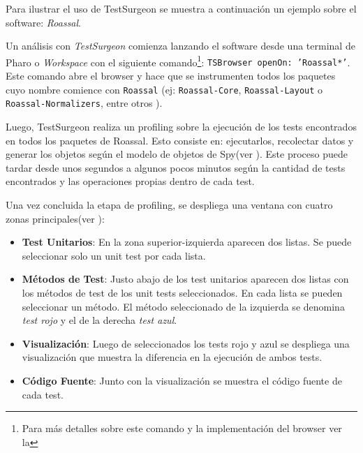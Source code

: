 \par Para ilustrar el uso de TestSurgeon se muestra a continuación un ejemplo sobre el software: \emph{Roassal}.

\par Un análisis con \emph{TestSurgeon} comienza lanzando el software desde una terminal de Pharo o \emph{Workspace} con el siguiente comando\footnote{Para más detalles sobre este comando y la implementación del browser ver la  }: {\tt TSBrowser openOn: 'Roassal*'}. Este comando abre el browser y hace que se instrumenten todos los paquetes cuyo nombre comience con {\tt Roassal} (ej: {\tt Roassal-Core}, {\tt Roassal-Layout} o {\tt Roassal-Normalizers}, entre otros ).


\par Luego, TestSurgeon realiza un profiling sobre la ejecución de los tests encontrados en todos los paquetes de Roassal. Esto consiste en: ejecutarlos, recolectar datos y generar los objetos según el modelo de objetos de Spy(ver ). Este proceso puede tardar desde unos segundos a algunos pocos minutos según la cantidad de tests encontrados y las operaciones propias dentro de cada test.

\par Una vez concluida la etapa de profiling, se despliega una ventana con cuatro zonas principales(ver ): 
\begin{itemize}
\item {\bf Test Unitarios}: En la zona superior-izquierda aparecen dos listas. Se puede seleccionar solo un unit test por cada lista.
\item {\bf Métodos de Test}: Justo abajo de los test unitarios aparecen dos listas con los métodos de test de los unit tests seleccionados. En cada lista se pueden seleccionar un método. El método seleccionado de la izquierda se denomina \emph{test rojo} y el de la derecha \emph{test azul}.
\item {\bf Visualización}: Luego de seleccionados los tests rojo y azul se despliega una visualización que muestra la diferencia en la ejecución de ambos tests.
\item {\bf Código Fuente}: Junto con la visualización se muestra el código fuente de cada test.
\end{itemize}


